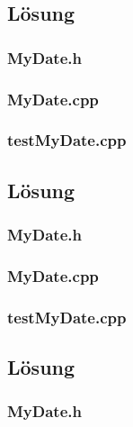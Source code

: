 \setcounter{section}{1}

\subsection{Lösung}
\subsubsection{MyDate.h}

\subsubsection{MyDate.cpp}

\subsubsection{testMyDate.cpp}


\setcounter{section}{2}

\subsection{Lösung}
\subsubsection{MyDate.h}

\subsubsection{MyDate.cpp}

\subsubsection{testMyDate.cpp}


\setcounter{section}{3}


\setcounter{section}{4}

\subsection{Lösung}
\subsubsection{MyDate.h}

